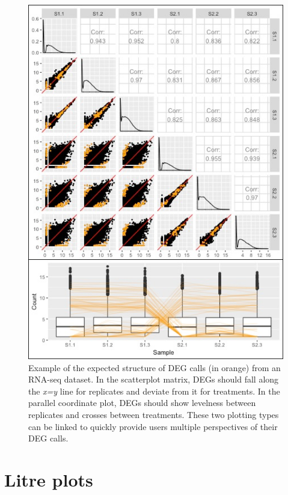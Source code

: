 \documentclass{bioinfo}
\begin{document}
\begin{figure}[!tpb]
\centerline{\includegraphics[width=\columnwidth]{../Bioinformatics/Pictures/SwitchSample/Switch12/NotSwitch/scatPCP.png}}
\caption{Example of the expected structure of DEG calls (in orange) from an RNA-seq dataset. In the scatterplot matrix, DEGs should fall along the \textit{x=y} line for replicates and deviate from it for treatments. In the parallel coordinate plot, DEGs should show levelness between replicates and crosses between treatments. These two plotting types can be linked to quickly provide users multiple perspectives of their DEG calls.
\label{scatPCP}}
\end{figure}

\section{Litre plots}
\end{document}
